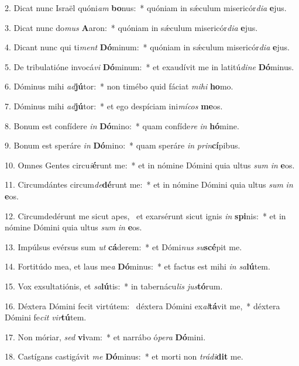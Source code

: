 2. Dicat nunc Israël quóni\textit{am} \textbf{bo}nus:~*  quóniam in sǽculum misericór\textit{di}\textit{a} \textbf{e}jus.\

3. Dicat nunc do\textit{mus} \textbf{A}aron:~*  quóniam in sǽculum misericór\textit{di}\textit{a} \textbf{e}jus.\

4. Dicant nunc qui ti\textit{ment} \textbf{Dó}minum:~*  quóniam in sǽculum misericór\textit{di}\textit{a} \textbf{e}jus.\

5. De tribulatióne invocá\textit{vi} \textbf{Dó}minum:~*  et exaudívit me in latitú\textit{di}\textit{ne} \textbf{Dó}minus.\

6. Dóminus mihi \textit{ad}\textbf{jú}tor:~*  non timébo quid fáciat \textit{mi}\textit{hi} \textbf{ho}mo.\

7. Dóminus mihi \textit{ad}\textbf{jú}tor:~*  et ego despíciam ini\textit{mí}\textit{cos} \textbf{me}os.\

8. Bonum est confídere \textit{in} \textbf{Dó}mino:~*  quam confíde\textit{re} \textit{in} \textbf{hó}mine.\

9. Bonum est speráre \textit{in} \textbf{Dó}mino:~*  quam speráre \textit{in} \textit{prin}\textbf{cí}pibus.\

10. Omnes Gentes circu\textit{i}\textbf{é}runt me:~*  et in nómine Dómini quia ultus \textit{sum} \textit{in} \textbf{e}os.\

11. Circumdántes circum\textit{de}\textbf{dé}runt me:~*  et in nómine Dómini quia ultus \textit{sum} \textit{in} \textbf{e}os.\

12. Circumdedérunt me sicut apes, \dag\  et exarsérunt sicut ignis \textit{in} \textbf{spi}nis:~*  et in nómine Dómini quia ultus \textit{sum} \textit{in} \textbf{e}os.\

13. Impúlsus evérsus sum \textit{ut} \textbf{cá}derem:~*  et Dómi\textit{nus} \textit{su}\textbf{scé}pit me.\

14. Fortitúdo mea, et laus me\textit{a} \textbf{Dó}minus:~*  et factus est mihi \textit{in} \textit{sa}\textbf{lú}tem.\

15. Vox exsultatiónis, et \textit{sa}\textbf{lú}tis:~*  in tabernácu\textit{lis} \textit{jus}\textbf{tó}rum.\

16. Déxtera Dómini fecit virtútem: \dag\  déxtera Dómini ex\textit{al}\textbf{tá}vit me,~*  déxtera Dómini fe\textit{cit} \textit{vir}\textbf{tú}tem.\

17. Non móriar, \textit{sed} \textbf{vi}vam:~*  et narrábo ó\textit{pe}\textit{ra} \textbf{Dó}mini.\

18. Castígans castigávit \textit{me} \textbf{Dó}minus:~*  et morti non \textit{trá}\textit{di}\textbf{dit} me.\

